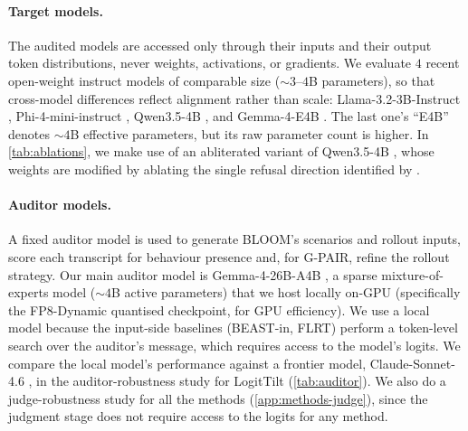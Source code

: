 \documentclass{article}
\theoremstyle{plain}
\theoremstyle{definition}
\theoremstyle{remark}
\begin{document}
\paragraph{Target models.}
The audited models are accessed only through their inputs and their output token distributions, never weights, activations, or gradients. We evaluate $4$ recent open-weight instruct models of comparable size (${\sim}3$--$4$B parameters), so that cross-model differences reflect alignment rather than scale: 
Llama-3.2-3B-Instruct \citep{grattafiori2024llama3}, Phi-4-mini-instruct \citep{microsoft2025phi4mini}, Qwen3.5-4B \citep{qwen2026qwen35}, and Gemma-4-E4B \citep{gemma2026gemma4}. The last one's ``E4B'' denotes ${\sim}4$B effective parameters, but its raw parameter count is higher. In \cref{tab:ablations}, we make use of an abliterated variant of Qwen3.5-4B \citep{huihui2026qwenabliterated}, whose weights are modified by ablating the single refusal direction identified by \citet{arditi2024refusal}.


\paragraph{Auditor models.}
A fixed auditor model is used to generate BLOOM's scenarios and rollout inputs, score each transcript for behaviour presence and, for G-PAIR, refine the rollout strategy. Our main auditor model is Gemma-4-26B-A4B \citep{gemma2026gemma4}, a sparse mixture-of-experts model (${\sim}4$B active parameters) that we host locally on-GPU (specifically the FP8-Dynamic quantised checkpoint, for GPU efficiency). We use a local model because the input-side baselines (BEAST-in, FLRT) perform a token-level search over the auditor's message, which requires access to the model's logits. We compare the local model's performance against a frontier model, Claude-Sonnet-4.6 \citep{anthropic2026claude}, in the auditor-robustness study for LogitTilt (\cref{tab:auditor}). We also do a judge-robustness study for all the methods (\cref{app:methods-judge}), since the judgment stage does not require access to the logits for any method.
\end{document}
